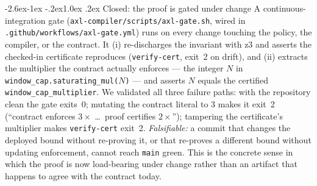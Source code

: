 \documentclass[11pt]{article}
\makeatletter
\renewcommand\subsection{\@startsection{subsection}{2}{\z@}%
  {-2.6ex\@plus -1ex \@minus -.2ex}{1.0ex \@plus .2ex}%
  {\normalfont\sffamily\large\bfseries}}
\theoremstyle{plain}
\theoremstyle{definition}
\theoremstyle{remark}
\makeatother
\begin{document}
\subsection{Closed: the proof is gated under change}\label{sec:gate}
A continuous-integration gate (\texttt{axl-compiler/scripts/axl-gate.sh},
wired in \texttt{.github/workflows/axl-gate.yml}) runs on every change touching
the policy, the compiler, or the contract. It (i) re-discharges the invariant
with z3 and asserts the checked-in certificate reproduces (\texttt{verify-cert},
exit~2 on drift), and (ii) extracts the multiplier the contract actually
enforces --- the integer $N$ in \texttt{window\_cap.saturating\_mul(}$N$\texttt{)}
--- and asserts $N$ equals the certified \texttt{window\_cap\_multiplier}. We
validated all three failure paths: with the repository clean the gate exits~0;
mutating the contract literal to $3$ makes it exit~2 (``contract enforces
$3\times$ \dots\ proof certifies $2\times$''); tampering the certificate's
multiplier makes \texttt{verify-cert} exit~2. \emph{Falsifiable:} a commit that
changes the deployed bound without re-proving it, or that re-proves a different
bound without updating enforcement, cannot reach \texttt{main} green. This is
the concrete sense in which the proof is now load-bearing under change rather
than an artifact that happens to agree with the contract today.
\end{document}
